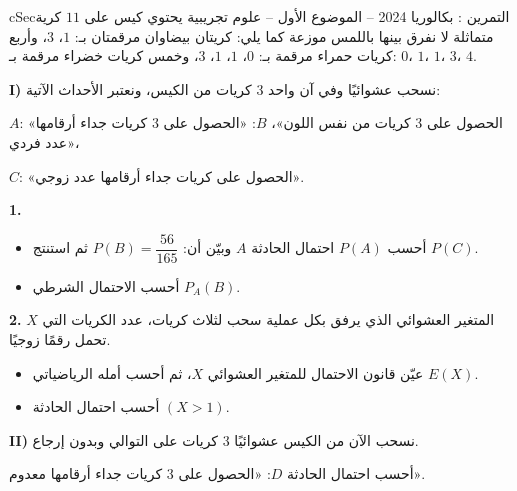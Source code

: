 \documentclass[12pt,a4paper]{article}
\newenvironment{BOX}[2]{\begin{otherlanguage}{english}\begin{arbox}{#1}{#2}}{\end{arbox}\end{otherlanguage}}
\newcounter{exo}
\newenvironment{tamrin}[1]{\stepcounter{exo}\begin{BOX}{cSec}{التمرين \theexo: #1}}{\end{BOX}}
\newenvironment{sq}{\begin{itemize}[leftmargin=2.4em,itemsep=3pt]}{\end{itemize}}
\newcommand{\qa}{\item[(أ)]}\newcommand{\qb}{\item[(ب)]}\newcommand{\qc}{\item[(جـ)]}\newcommand{\qd}{\item[(د)]}\newcommand{\qe}{\item[(هـ)]}
\newcommand{\QQ}[1]{\par\smallskip\textbf{#1.} }
\begin{document}
\begin{tamrin}{بكالوريا 2024 -- الموضوع الأول -- علوم تجريبية}
يحتوي كيس على $11$ كرية متماثلة لا نفرق بينها باللمس موزعة كما يلي: كريتان بيضاوان مرقمتان بـ: $1$، $3$، وأربع كريات حمراء مرقمة بـ: $0$، $1$، $1$، $3$، وخمس كريات خضراء مرقمة بـ: $0$، $1$، $1$، $3$، $4$.

\textbf{I)} نسحب عشوائيًا وفي آن واحد $3$ كريات من الكيس، ونعتبر الأحداث الآتية:

$A$: «الحصول على $3$ كريات من نفس اللون»، \quad $B$: «الحصول على $3$ كريات جداء أرقامها عدد فردي»،

$C$: «الحصول على كريات جداء أرقامها عدد زوجي».
\QQ{1}
\begin{sq}
\qa أحسب $P(A)$ احتمال الحادثة $A$ وبيّن أن: $P(B)=\dfrac{56}{165}$ ثم استنتج $P(C)$.
\qb أحسب الاحتمال الشرطي $P_A(B)$.
\end{sq}
\QQ{2} $X$ المتغير العشوائي الذي يرفق بكل عملية سحب لثلاث كريات، عدد الكريات التي تحمل رقمًا زوجيًا.
\begin{sq}
\qa عيّن قانون الاحتمال للمتغير العشوائي $X$، ثم أحسب أمله الرياضياتي $E(X)$.
\qb أحسب احتمال الحادثة $(X>1)$.
\end{sq}
\textbf{II)} نسحب الآن من الكيس عشوائيًا $3$ كريات على التوالي وبدون إرجاع.

أحسب احتمال الحادثة $D$: «الحصول على $3$ كريات جداء أرقامها معدوم».
\end{tamrin}
\end{document}
